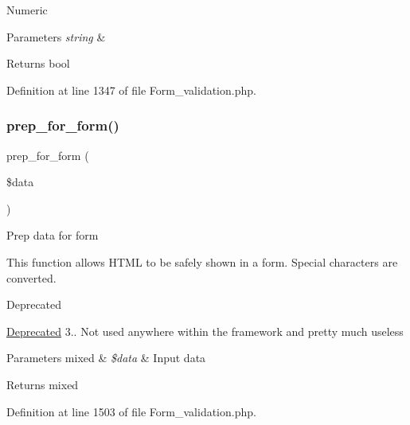 Numeric


\begin{DoxyParams}{Parameters}
{\em string} & \\
\hline
\end{DoxyParams}
\begin{DoxyReturn}{Returns}
bool 
\end{DoxyReturn}


Definition at line 1347 of file Form\+\_\+validation.\+php.

\mbox{\label{class_c_i___form__validation_a53938e0a994c9995de5c979ecb27bf1d}} 
\subsubsection{\texorpdfstring{prep\_for\_form()}{prep\_for\_form()}}
{\footnotesize\ttfamily prep\+\_\+for\+\_\+form (\begin{DoxyParamCaption}\item[{}]{\$data }\end{DoxyParamCaption})}

Prep data for form

This function allows H\+T\+ML to be safely shown in a form. Special characters are converted.

\begin{DoxyRefDesc}{Deprecated}
\item[\mbox{\hyperlink{deprecated__deprecated000019}{Deprecated}}]3.. Not used anywhere within the framework and pretty much useless \end{DoxyRefDesc}

\begin{DoxyParams}[1]{Parameters}
mixed & {\em \$data} & Input data \\
\hline
\end{DoxyParams}
\begin{DoxyReturn}{Returns}
mixed 
\end{DoxyReturn}


Definition at line 1503 of file Form\+\_\+validation.\+php.

\mbox{\label{class_c_i___form__validation_a1218a70d68fe797013a53b3c7cd41d2f}} 
